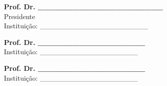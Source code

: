 \documentclass[
	12pt,				%
	oneside,			%
	a4paper,			%
	english,			%
	brazil				%
	]{abntex2ppgsi}
\begin{document}
\begin{folhadeaprovacao}
\begin{center}
%
% 
% 
%
% 
% 
% 
%
%
\textbf{Prof. Dr. \_\_\_\_\_\_\_\_\_\_\_\_\_\_\_\_\_\_\_\_\_} 
\\ Presidente 
\\ Instituição: \_\_\_\_\_\_\_\_\_\_\_\_\_\_\_\_\_\_\_\_\_ 

\vspace*{2cm}

\textbf{Prof. Dr. \_\_\_\_\_\_\_\_\_\_\_\_\_\_\_\_\_\_} 
\\ Instituição: \_\_\_\_\_\_\_\_\_\_\_\_\_\_\_\_\_\_\_

\vspace*{2cm}

\textbf{Prof. Dr. \_\_\_\_\_\_\_\_\_\_\_\_\_\_\_\_\_\_} 
\\ Instituição: \_\_\_\_\_\_\_\_\_\_\_\_\_\_\_\_\_\_\_

\end{center}
  
\end{folhadeaprovacao}

%
% 
\end{document}
